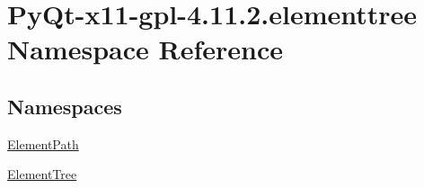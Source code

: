 \hypertarget{namespacePyQt-x11-gpl-4_811_82_1_1elementtree}{}\section{Py\+Qt-\/x11-\/gpl-\/4.11.2.elementtree Namespace Reference}
\label{namespacePyQt-x11-gpl-4_811_82_1_1elementtree}
\subsection*{Namespaces}
\begin{DoxyCompactItemize}
\item 
 \hyperlink{namespacePyQt-x11-gpl-4_811_82_1_1elementtree_1_1ElementPath}{Element\+Path}
\item 
 \hyperlink{namespacePyQt-x11-gpl-4_811_82_1_1elementtree_1_1ElementTree}{Element\+Tree}
\end{DoxyCompactItemize}

